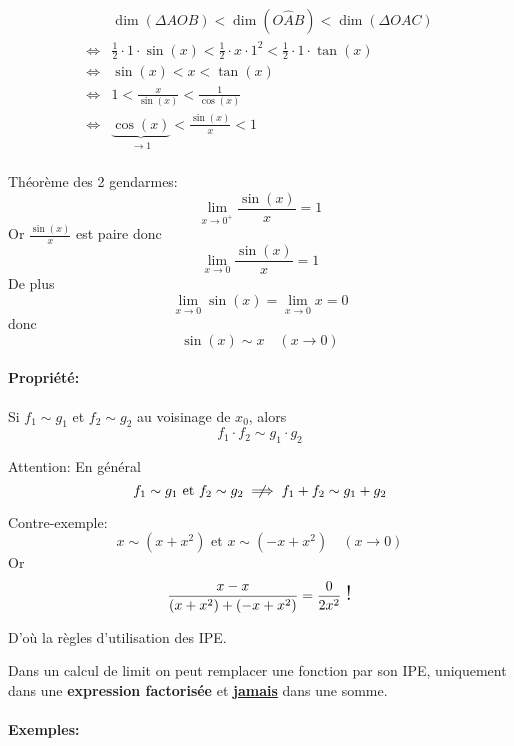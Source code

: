 \documentclass[
    11pt,
    a4paper,
    oneside,
    headinlcude, footinclude,
    twoside,
]{report}
\newcommand\Warning{
    \makebox[1.4em][c]{
    \makebox[-5.5pt][c]{\raisebox{.2em}{!}}
    \makebox[0pt][c]{\color{red}\huge$\bigtriangleup$}}
}
\begin{document}
\[
\begin{split}
&\dim (\Delta AOB) < \dim (O\hat A B) < \dim (\Delta OAC)\\
\iff & \frac{1}{2} \cdot 1 \cdot \sin(x) < \frac{1}{2} \cdot x \cdot
1^{2} < \frac{1}{2} \cdot 1 \cdot \tan(x)\\
\iff & \sin(x) < x < \tan(x) \\
\iff & 1 < \frac{x}{\sin(x)} < \frac{1}{\cos(x)}\\
\iff & \underbrace{\cos(x)}_{\to 1} < \frac{\sin(x)}{x} < 1\\
\end{split}
\]

Théorème des 2 gendarmes: $$\lim_{x \to 0^{+}}  \frac{\sin(x)}{x} = 1$$
Or $\frac{\sin(x)}{x}$ est paire donc $$\lim_{x \to 0} \frac{\sin(x)}{x} = 1$$
De plus $$\lim_{x \to 0} \sin(x) = \lim_{x \to 0} x = 0$$
donc $$\sin(x) \sim x \quad  (x \to 0)$$


\paragraph{Propriété:}

Si $f_{1} \sim g_{1}$ et $f_{2} \sim g_{2}$ au voisinage de $x_{0}$, alors $$f_{1}
\cdot f_{2} \sim g_{1} \cdot g_{2} $$

\Warning Attention: En général
$$f_{1} \sim g_{1}  \text{ et } f_{2} \sim g_{2} \centernot\implies f_{1} + f_{2}
\sim g_{1} + g_{2} $$

Contre-exemple: 
$$ x \sim (x + x^{2}) \text{ et } x \sim (-x + x^{2}) \quad (x \to 0)$$
Or
$$\frac{x-x}{(x+x^{2})+(-x + x^{2})} = \frac{0}{2x^{2}} {\text{ \Large!}}$$

D'où la règles d'utilisation des IPE.

Dans un calcul de limit on peut remplacer une fonction par son IPE, uniquement
dans une \textbf{expression factorisée} et \textbf{\underline{jamais}} dans une somme.

\paragraph{Exemples:}
\end{document}
